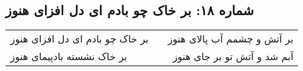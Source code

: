 \begin{center}
\section*{شماره ۱۸: بر خاک چو بادم ای دل افزای هنوز}
\label{sec:018}
\begin{longtable}{l p{0.5cm} r}
بر خاک چو بادم ای دل افزای هنوز
&&
بر آتش و چشمم آب پالای هنوز
\\
بر خاک نشسته بادپیمای هنوز
&&
آبم شد و آتش تو بر جای هنوز
\\
\end{longtable}
\end{center}
